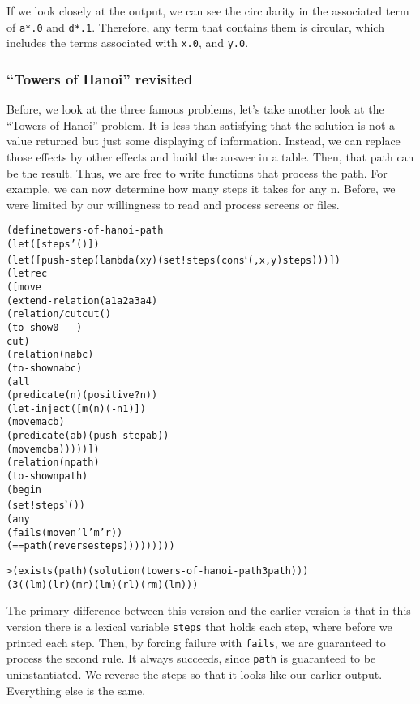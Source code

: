If we look closely at the output, we can see the circularity in the
associated term of \texttt{a*.0} and \texttt{d*.1}.  Therefore, any
term that contains them is circular, which includes the terms
associated with \texttt{x.0}, and \texttt{y.0}.

\subsubsection{``Towers of Hanoi'' revisited}

Before, we look at the three famous problems, let's take another look at
the ``Towers of Hanoi'' problem.  It is less than satisfying that the
solution is not a value returned but just some displaying of information.
Instead, we can replace those effects by other effects and build
the answer in a table.  Then, that path can be the result.  Thus, we are
free to write functions that process the path.  For example, we can now
determine how many steps it takes for any n.  Before, we were limited by
our willingness to read and process screens or files.
\begin{alltt}
(define towers-of-hanoi-path
  (let ([steps '()])
    (let ([push-step (lambda (x y) (set! steps (cons `(,x ,y) steps)))])
      (letrec
          ([move
             (extend-relation (a1 a2 a3 a4)
               (relation/cut cut ()
                 (to-show 0 _ _ _)
                 cut)
               (relation (n a b c)
                 (to-show n a b c)
                 (all
                   (predicate (n) (positive? n))
                   (let-inject ([m (n) (- n 1)])
                     (move m a c b)
                     (predicate (a b) (push-step a b))
                     (move m c b a)))))])
        (relation (n path)
          (to-show n path)
          (begin
            (set! steps '())
            (any
              (fails (move n 'l 'm 'r))
              (== path (reverse steps)))))))))

> (exists (path) (solution (towers-of-hanoi-path 3 path)))
(3 ((l m) (l r) (m r) (l m) (r l) (r m) (l m)))
\end{alltt}

The primary difference between this version and the earlier version is that
in this version there is a lexical variable \texttt{steps} that holds each
step, where before we printed each step.  Then, by forcing failure with
\texttt{fails}, we are guaranteed to process the second rule.  It always
succeeds, since \texttt{path} is guaranteed to be uninstantiated. We
reverse the steps so that it looks like our earlier output. Everything else
is the same.

